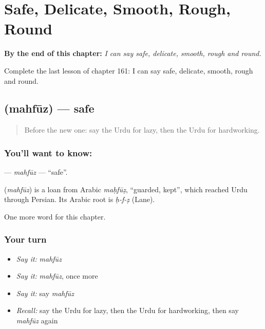 
\chapter{Safe, Delicate, Smooth, Rough, Round}
\label{ch:ur-safe-delicate-smooth-rough-round}

\begin{chapteropening}
\textbf{By the end of this chapter:} \emph{I can say safe, delicate, smooth, rough and round.}

Complete the last lesson of chapter 161: I can say safe, delicate, smooth, rough and round.
\end{chapteropening}

\section[\texorpdfstring{\ur{محفوظ} (mahfūz)}{محفوظ (mahfūz)}]{ (mahfūz) — safe}

\label{lesson:UR-C161-mahfuz}



\begin{quote}
Before the new one: say the Urdu for lazy, then the Urdu for hardworking.
\end{quote}

\subsection*{You'll want to know: }
\textbf{} — \emph{mahfūz} — \textquotedblleft{}safe\textquotedblright{}.

\begin{cousinweb}
\textbf{} (\emph{mahfūz}) is a loan from Arabic \emph{maḥfūẓ}, \textquotedblleft{}guarded, kept\textquotedblright{}, which reached Urdu through Persian. Its Arabic root is \emph{ḥ-f-ẓ} (Lane).
\end{cousinweb}

\begin{grammarlens}[title={What you've built}]
One more word for this chapter.
\end{grammarlens}

\subsection*{Your turn}
\begin{itemize}
\raggedright
  \item \emph{Say it:} \emph{mahfūz}
  \item \emph{Say it:} \emph{mahfūz}, once more
  \item \emph{Say it:} say \emph{mahfūz}
  \item \emph{Recall:} say the Urdu for lazy, then the Urdu for hardworking, then say \emph{mahfūz} again
\end{itemize}


